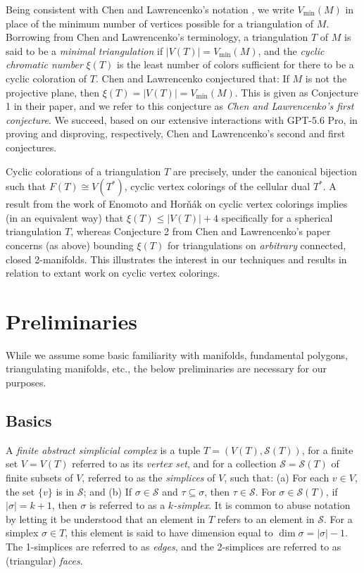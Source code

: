 \documentclass[12pt]{article}
\begin{document}
 Being consistent with Chen and Lawrencenko's notation \cite{ChenLawrencenko1999}, we write $V_{\min}(M)$ in place of the minimum 
 number of vertices possible for a triangulation of $M$. Borrowing from Chen and Lawrencenko's terminology, a triangulation $T$ of $M$ 
 is said to be a \emph{minimal 
 triangulation} if $|V(T)| = V_{\min}(M)$, and the \emph{cyclic chromatic number} $\xi(T)$ is the least number of colors sufficient for there 
 to be a cyclic coloration of $T$. Chen and Lawrencenko conjectured that: 
 If $M$ is not the projective plane, 
 then $\xi(T) = |V(T)| = V_{\min}(M)$. 
 This is given as Conjecture 1 in their paper, and we refer to this conjecture as \emph{Chen and Lawrencenko's first conjecture}. 
 We succeed, based on our extensive interactions with GPT-5.6 Pro, in proving and disproving, respectively, 
 Chen and Lawrencenko's second and first conjectures. 
 
 Cyclic colorations of a triangulation $T$ are precisely, under the canonical bijection such that $F(T) \cong V(T^{\ast})$, cyclic vertex 
 colorings of the cellular dual $T^{\ast}$. A result from the work of Enomoto and Hor\v n\'ak \cite{EnomotoHornak2009} on cyclic vertex 
 colorings implies (in an equivalent way) that $\xi(T) \leq |V(T)| + 4$ specifically for a spherical triangulation $T$, 
 whereas Conjecture 2 from Chen and Lawrencenko's paper \cite{ChenLawrencenko1999} 
 concerns (as above) bounding $\xi(T)$ for triangulations on \emph{arbitrary} connected, closed 2-manifolds. 
 This illustrates the interest in our techniques and results in relation to extant work on cyclic vertex colorings. 

\section{Preliminaries}\label{secPrelim}
 While we assume some basic familiarity with manifolds, fundamental polygons, triangulating manifolds, etc., 
 the below preliminaries are necessary for our purposes. 

\subsection{Basics}
 A \emph{finite abstract simplicial complex} is a tuple 
 $T = (V(T), \mathcal{S}(T))$, 
 for a finite set $V = V(T)$ referred to as its \emph{vertex set}, 
 and for a collection $\mathcal{S} = \mathcal{S}(T)$ 
 of finite subsets of $V$, referred to as the \emph{simplices} of $V$, 
 such that: (a)
 For each $v \in V$, the set $\{ v \}$ is in $\mathcal{S}$; and 
 (b) If $\sigma \in \mathcal{S}$ and $\tau \subseteq \sigma$, then $\tau \in \mathcal{S}$. 
 For $\sigma \in \mathcal{S}(T)$, if $|\sigma| = k + 1$, then $\sigma$ is referred to as a \emph{$k$-simplex}. 
 It is common to abuse notation by letting it be understood that an element in $T$ refers to an element in $\mathcal{S}$. 
 For a simplex $\sigma \in T$, this element is said to have 
 dimension equal to $\dim \sigma = |\sigma| - 1$. 
 The 1-simplices are referred to as \emph{edges}, and the 2-simplices are referred to as (triangular) \emph{faces}. 
\end{document}
